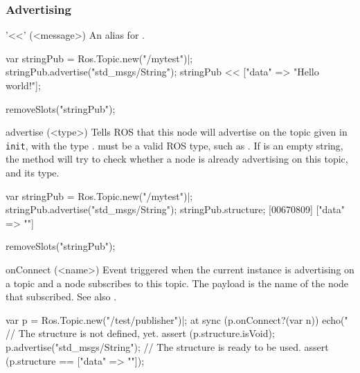 \subsubsection{Advertising}

\begin{urbiscriptapi}
\item['<<'](<message>)%
  An alias for .
\begin{urbiscript}
var stringPub = Ros.Topic.new("/mytest")|;
stringPub.advertise("std_msgs/String");
stringPub << ["data" => "Hello world!"];
\end{urbiscript}
\begin{urbicomment}
removeSlots("stringPub");
\end{urbicomment}


\item[advertise](<type>)%
  Tells ROS that this node will advertise on the topic given in
  \lstinline{init}, with the type .  must be a valid ROS
  type, such as . If  is an empty string, the
  method will try to check whether a node is already advertising on this
  topic, and its type.
\begin{urbiscript}
var stringPub = Ros.Topic.new("/mytest")|;
stringPub.advertise("std_msgs/String");
stringPub.structure;
[00670809] ["data" => ""]
\end{urbiscript}
\begin{urbicomment}
removeSlots("stringPub");
\end{urbicomment}


\item[onConnect](<name>)%
  Event triggered when the current instance is advertising on a topic and a
  node subscribes to this topic. The payload  is the name of the
  node that subscribed.  See also .
\begin{urbiscript}
var p = Ros.Topic.new("/test/publisher")|;
at sync (p.onConnect?(var n))
  echo("%
// The structure is not defined, yet.
assert (p.structure.isVoid);
p.advertise("std_msgs/String");
// The structure is ready to be used.
assert (p.structure == ["data" => ""]);


\end{urbiscript}
\end{urbiscriptapi}
